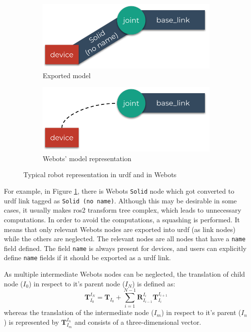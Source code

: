 \begin{figure}[H]
\centering
\begin{subfigure}{\textwidth}
  \centering
  \includegraphics[width=.7\linewidth]{generalization/figures/squashing_transforms_actual.pdf}
  \caption{Exported model}
  \label{fig:generalization:squashing_transforms:actual}
\end{subfigure}
\begin{subfigure}{\textwidth}
  \centering
  \includegraphics[width=.7\linewidth]{generalization/figures/squashing_transforms_desired.pdf}
  \caption{Webots' model representation}
  \label{fig:generalization:squashing_transforms:desired}
\end{subfigure}
\caption{Typical robot representation in \ac{urdf} and in Webots}
\label{fig:generalization:squashing_transforms}
\end{figure}

For example, in Figure \ref{fig:generalization:squashing_transforms:actual}, there is Webots \texttt{Solid} node which got converted to \ac{urdf} link tagged as \texttt{Solid (no name)}. 
Although this may be desirable in some cases, it usually makes \ac{ros2} transform tree complex, which leads to unnecessary computations.
In order to avoid the computations, a squashing is performed.
It means that only relevant Webots nodes are exported into \ac{urdf} (as link nodes) while the others are neglected.
The relevant nodes are all nodes that have a \texttt{name} field defined.
The field \texttt{name} is always present for devices, and users can explicitly define \texttt{name} fields if it should be exported as a \ac{urdf} link.

As multiple intermediate Webots nodes can be neglected, the translation of child node ($I_0$) in respect to it's parent node ($I_N$) is defined as:
\begin{equation}
    \bm{T}_{I_0}^{I_N} = \bm{T}_{I_0} + \sum_{i=1}^{N-1} \bm{R}_{I_{i-1}}^{I_i} \bm{T}_{I_i}^{I_{i+1}}
\end{equation}
whereas the translation of the intermediate node ($I_m$) in respect to it's parent ($I_n$) is represented by $ \bm{T}_{I_m}^{I_n} $ and consists of a three-dimensional vector.

